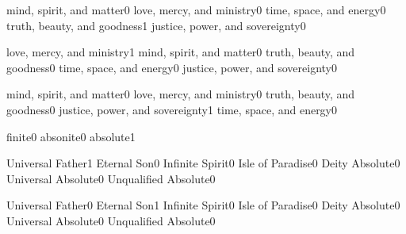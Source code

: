 \quizheader
{}

  {mind, spirit, and matter}{0}
  {love, mercy, and ministry}{0}
  {time, space, and energy}{0}
  {truth, beauty, and goodness}{1}
  {justice, power, and sovereignty}{0}
\qstop

  {love, mercy, and ministry}{1}
  {mind, spirit, and matter}{0}
  {truth, beauty, and goodness}{0}
  {time, space, and energy}{0}
  {justice, power, and sovereignty}{0}
\qstop

  {mind, spirit, and matter}{0}
  {love, mercy, and ministry}{0}
  {truth, beauty, and goodness}{0}
  {justice, power, and sovereignty}{1}
  {time, space, and energy}{0}
\qstop


  {finite}{0}
  {absonite}{0}
  {absolute}{1}
\qstop


  {Universal Father}{1}
  {Eternal Son}{0}
  {Infinite Spirit}{0}
  {Isle of Paradise}{0}
  {Deity Absolute}{0}
  {Universal Absolute}{0}
  {Unqualified Absolute}{0}
\qstop

  {Universal Father}{0}
  {Eternal Son}{1}
  {Infinite Spirit}{0}
  {Isle of Paradise}{0}
  {Deity Absolute}{0}
  {Universal Absolute}{0}
  {Unqualified Absolute}{0}
\qstop



